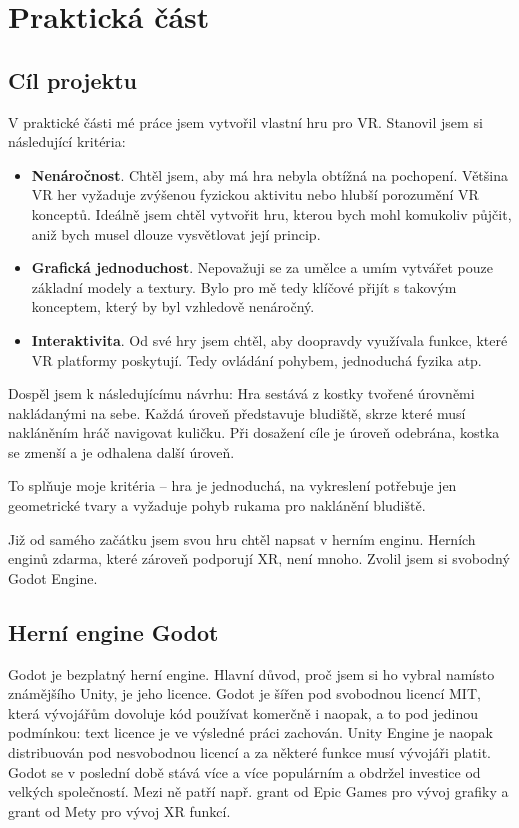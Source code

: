 \part{Praktická část}

\chapter{Cíl projektu}

V praktické části mé práce jsem vytvořil vlastní hru pro VR. Stanovil jsem si následující kritéria:

\begin{itemize}
	\item \textbf{Nenáročnost}. Chtěl jsem, aby má hra nebyla obtížná na pochopení. Většina VR her vyžaduje zvýšenou fyzickou aktivitu nebo hlubší porozumění VR konceptů. Ideálně jsem chtěl vytvořit hru, kterou bych mohl komukoliv půjčit, aniž bych musel dlouze vysvětlovat její princip.
  \item \textbf{Grafická jednoduchost}. Nepovažuji se za umělce a umím vytvářet pouze základní modely a textury. Bylo pro mě tedy klíčové přijít s takovým konceptem, který by byl vzhledově nenáročný.
  \item \textbf{Interaktivita}. Od své hry jsem chtěl, aby doopravdy využívala funkce, které VR platformy poskytují. Tedy ovládání pohybem, jednoduchá fyzika atp.
\end{itemize}

Dospěl jsem k následujícímu návrhu: Hra sestává z kostky tvořené úrovněmi nakládanými na sebe. Každá úroveň představuje bludiště, skrze které musí nakláněním hráč navigovat kuličku. Při dosažení cíle je úroveň odebrána, kostka se zmenší a je odhalena další úroveň.

To splňuje moje kritéria -- hra je jednoduchá, na vykreslení potřebuje jen geometrické tvary a vyžaduje pohyb rukama pro naklánění bludiště.

Již od samého začátku jsem svou hru chtěl napsat v herním enginu. Herních enginů zdarma, které zároveň podporují XR, není mnoho. Zvolil jsem si svobodný Godot Engine.

\chapter{Herní engine Godot}

Godot je bezplatný herní engine. Hlavní důvod, proč jsem si ho vybral namísto známějšího Unity, je jeho licence. Godot je šířen pod svobodnou licencí MIT, která vývojářům dovoluje kód používat komerčně i naopak, a to pod jedinou podmínkou: text licence je ve výsledné práci zachován. Unity Engine je naopak distribuován pod nesvobodnou licencí a za některé funkce musí vývojáři platit. Godot se v poslední době stává více a více populárním a obdržel investice od velkých společností. Mezi ně patří např. grant od Epic Games pro vývoj grafiky a grant od Mety pro vývoj XR funkcí. \cite{godot_epicgames} \cite{godot_meta}

